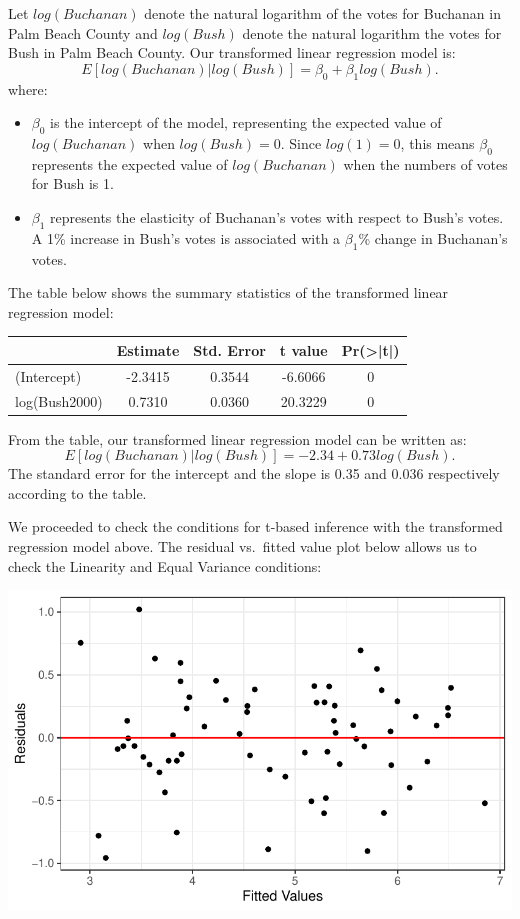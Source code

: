 \documentclass[
  letterpaper,
  DIV=11,
  numbers=noendperiod]{scrartcl}
\begin{document}
Let \(log(Buchanan)\) denote the natural logarithm of the votes for
Buchanan in Palm Beach County and \(log(Bush)\) denote the natural
logarithm the votes for Bush in Palm Beach County. Our transformed
linear regression model is:
\[E[log(Buchanan) | log(Bush)] = \beta_0 + \beta_1log(Bush).\]where:

\begin{itemize}
\item
  \(\beta_0\) is the intercept of the model, representing the expected
  value of \(log(Buchanan)\) when \(log(Bush) = 0\). Since
  \(log(1) = 0\), this means \(\beta_0\) represents the expected value
  of \(log(Buchanan)\) when the numbers of votes for Bush is 1.
\item
  \(\beta_1\) represents the elasticity of Buchanan's votes with respect
  to Bush's votes. A 1\% increase in Bush's votes is associated with a
  \(\beta_1\)\% change in Buchanan's votes.
\end{itemize}

The table below shows the summary statistics of the transformed linear
regression model:

\begin{table}[H]
\centering
\begin{tabular}[t]{lcccc}
\toprule
  & Estimate & Std. Error & t value & Pr(>|t|)\\
\midrule
(Intercept) & -2.3415 & 0.3544 & -6.6066 & 0\\
log(Bush2000) & 0.7310 & 0.0360 & 20.3229 & 0\\
\bottomrule
\end{tabular}
\end{table}

From the table, our transformed linear regression model can be written
as: \[E[log(Buchanan) | log(Bush)] = -2.34 + 0.73log(Bush).\] The
standard error for the intercept and the slope is 0.35 and 0.036
respectively according to the table.

We proceeded to check the conditions for t-based inference with the
transformed regression model above. The residual vs.~fitted value plot
below allows us to check the Linearity and Equal Variance conditions:

\includegraphics{SDS-291-case-study-1_files/figure-pdf/unnamed-chunk-9-1.pdf}
\end{document}
